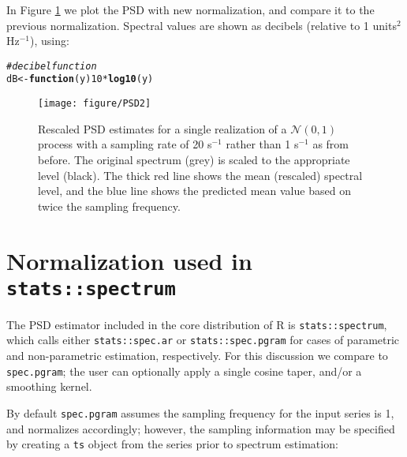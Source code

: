 \documentclass[10pt]{article}\usepackage[]{graphicx}\usepackage[]{color}
\makeatletter
\def\maxwidth{ %
  \ifdim\Gin@nat@width>\linewidth
    \linewidth
  \else
    \Gin@nat@width
  \fi
}
\newcommand{\hlnum}[1]{\textcolor[rgb]{0.686,0.059,0.569}{#1}}%
\newcommand{\hlcom}[1]{\textcolor[rgb]{0.678,0.584,0.686}{\textit{#1}}}%
\newcommand{\hlopt}[1]{\textcolor[rgb]{0,0,0}{#1}}%
\newcommand{\hlstd}[1]{\textcolor[rgb]{0.345,0.345,0.345}{#1}}%
\newcommand{\hlkwa}[1]{\textcolor[rgb]{0.161,0.373,0.58}{\textbf{#1}}}%
\newcommand{\hlkwb}[1]{\textcolor[rgb]{0.69,0.353,0.396}{#1}}%
\newcommand{\hlkwc}[1]{\textcolor[rgb]{0.333,0.667,0.333}{#1}}%
\newcommand{\hlkwd}[1]{\textcolor[rgb]{0.737,0.353,0.396}{\textbf{#1}}}%
\newenvironment{kframe}{%
 \def\at@end@of@kframe{}%
 \ifinner\ifhmode%
  \def\at@end@of@kframe{\end{minipage}}%
  \begin{minipage}{\columnwidth}%
 \fi\fi%
 \def\FrameCommand##1{\hskip\@totalleftmargin \hskip-\fboxsep
 \colorbox{shadecolor}{##1}\hskip-\fboxsep
     \hskip-\linewidth \hskip-\@totalleftmargin \hskip\columnwidth}%
 \MakeFramed {\advance\hsize-\width
   \@totalleftmargin\z@ \linewidth\hsize
   \@setminipage}}%
 {\par\unskip\endMakeFramed%
 \at@end@of@kframe}
\newenvironment{knitrout}{}{} %
\newcommand{\Rcmd}[1]{\texttt{#1}}
\makeatother
\begin{document}
In Figure \ref{fig:psdsamp} we
plot the PSD with new normalization, and compare it to
the previous normalization.
Spectral values are shown as
decibels (relative to 1 units$^2$ Hz$^{-1}$), using:

\begin{knitrout}
\color{fgcolor}\begin{kframe}
\begin{alltt}
\hlcom{# decibel function}
\hlstd{dB} \hlkwb{<-} \hlkwa{function}\hlstd{(}\hlkwc{y}\hlstd{)} \hlnum{10} \hlopt{*} \hlkwd{log10}\hlstd{(y)}
\end{alltt}
\end{kframe}
\end{knitrout}

\begin{figure}[htb!]
\begin{center}
\begin{knitrout}
\color{fgcolor}
\texttt{[image: figure/PSD2]} 

\end{knitrout}

\caption{Rescaled PSD estimates for a single realization of a 
$\mathcal{N}(0,1)$ process with a sampling rate of 20 s$^{-1}$ rather
than 1 s$^{-1}$ as from before.  
The original spectrum (grey) is scaled to the appropriate level
(black).
The thick red line shows the mean (rescaled) spectral level, and the
blue line shows the predicted mean value based on twice the sampling
frequency.}
\label{fig:psdsamp}
\end{center}
\end{figure}

\section{Normalization used in \Rcmd{stats::spectrum}}

The PSD estimator included in
the core distribution of R is \Rcmd{stats::spectrum}, which
calls either \Rcmd{stats::spec.ar} or \Rcmd{stats::spec.pgram} for 
cases of
parametric and non-parametric estimation, respectively.  
For this discussion we compare to \Rcmd{spec.pgram};
the user can optionally apply a single cosine taper, 
and/or a smoothing kernel.

By default \Rcmd{spec.pgram} assumes the sampling frequency
for the input series is 1, and normalizes accordingly; however,
the sampling information may be specified by creating a \Rcmd{ts}
object from the series prior to spectrum estimation:
\end{document}
